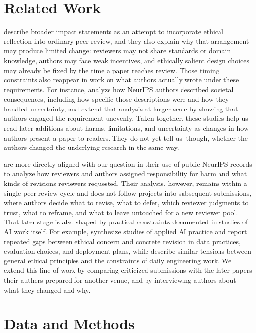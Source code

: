 \documentclass[sigconf,nonacm]{acmart} %
\begin{document}
\section{Related Work}

\citet{prunkl2021institutionalizing} describe broader impact statements as an attempt to incorporate ethical reflection into ordinary peer review, and they also explain why that arrangement may produce limited change: reviewers may not share standards or domain knowledge, authors may face weak incentives, and ethically salient design choices may already be fixed by the time a paper reaches review. Those timing constraints also reappear in work on what authors actually wrote under these requirements. For instance, \citet{nanayakkara2021broader} analyze how NeurIPS authors described societal consequences, including how specific those descriptions were and how they handled uncertainty, and \citet{ashurst2022ethics} extend that analysis at larger scale by showing that authors engaged the requirement unevenly. Taken together, these studies help us read later additions about harms, limitations, and uncertainty as changes in how authors present a paper to readers. They do not yet tell us, though, whether the authors changed the underlying research in the same way.

\citet{liu2022examining} are more directly aligned with our question in their use of public NeurIPS records to analyze how reviewers and authors assigned responsibility for harm and what kinds of revisions reviewers requested. Their analysis, however, remains within a single peer review cycle and does not follow projects into subsequent submissions, where authors decide what to revise, what to defer, which reviewer judgments to trust, what to reframe, and what to leave untouched for a new reviewer pool. That later stage is also shaped by practical constraints documented in studies of AI work itself. For example, \citet{pant2024ethics} synthesize studies of applied AI practice and report repeated gaps between ethical concern and concrete revision in data practices, evaluation choices, and deployment plans, while \citet{morley2023operationalising} describe similar tensions between general ethical principles and the constraints of daily engineering work. We extend this line of work by comparing criticized submissions with the later papers their authors prepared for another venue, and by interviewing authors about what they changed and why.

\section{Data and Methods}
\end{document}
